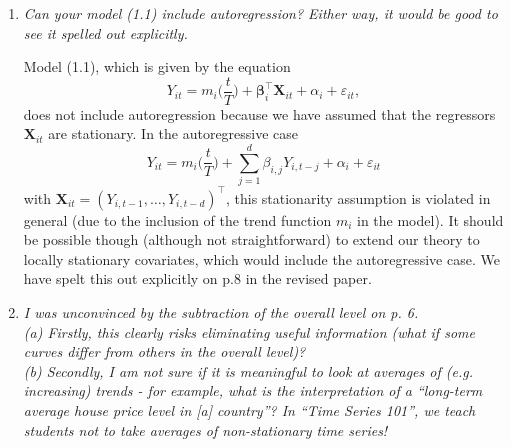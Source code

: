 \documentclass[a4paper,12pt]{article}
\begin{document}
\begin{enumerate}[label=\arabic*.,leftmargin=0.6cm]
\item {\color{black}\textit{Can your model (1.1) include autoregression? Either way, it would be good to see it spelled out explicitly.}}

Model (1.1), which is given by the equation
\[ Y_{it} = m_i\Big(\frac{t}{T}\Big) + \boldsymbol{\beta}_i^\top \boldsymbol{X}_{it} + \alpha_i + \varepsilon_{it}, \]
does not include autoregression because we have assumed that the regressors $\boldsymbol{X}_{it}$ are stationary. In the autoregressive case 
\[ Y_{it} = m_i\Big(\frac{t}{T}\Big) + \sum_{j=1}^d \beta_{i,j} Y_{i,t-j} + \alpha_i + \varepsilon_{it} \]
with $\boldsymbol{X}_{it} = (Y_{i,t-1},\ldots,Y_{i,t-d})^\top$, this stationarity assumption is violated in general (due to the inclusion of the trend function $m_i$ in the model). It should be possible though (although not straightforward) to extend our theory to locally stationary covariates, which would include the autoregressive case. We have spelt this out explicitly on p.8 in the revised paper. 



\item {\color{black}\textit{I was unconvinced by the subtraction of the overall level on p. 6. \\
(a) Firstly, this clearly risks eliminating useful information (what if some curves differ from others in the overall level)? \\
(b) Secondly, I am not sure if it is meaningful to look at averages of (e.g. increasing) trends - for example, what is the interpretation of a “long-term average house price level in [a] country”? In “Time Series 101”, we teach students not to take averages of non-stationary time series!}  }


\end{enumerate}
\end{document}
